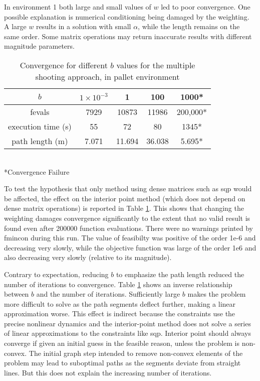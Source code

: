 In environment 1 both large and small values of $w$ led to poor convergence. One possible explanation is numerical conditioning being damaged by the weighting. A large $w$ results in a solution with small $\alpha$, while the length remains on the same order. Some matrix operations may return inaccurate results with different magnitude parameters.
\begin{table}
\begin{center}
	\begin{tabular}{ |c|c|c|c|c| }
		\hline
		 $b$ & $1\times10^{-3}$&  1 & 100 & 1000* \\ 
		 \hline
		 fevals &7929 & 10873 & 11986& 200,000* \\  
		 execution time (s)& 55 & 72 & 80 & 1345* \\
		 path length (m) & 7.071 & 11.694 & 36.038 & 5.695*\\
		 \hline  
	\end{tabular} \\
		 *Convergence Failure
\end{center}
\label{tab:b_dependence}
\caption{Convergence for different $b$ values for the multiple shooting approach, in pallet environment} 
\end{table}
To test the hypothesis that only method using dense matrices such as sqp would be affected, the effect on the interior point method (which does not depend on dense matrix operations) is reported in Table \ref{tab:b_dependence}. This shows that changing the weighting damages convergence significantly to the extent that no valid result is found even after 200000 function evaluations. There were no warnings printed by fmincon during this run. The value of feasibilty was positive of the order 1e-6 and decreasing very slowly, while the objective function was large of the order 1e6 and also decreasing very slowly (relative to its magnitude).

Contrary to expectation, reducing $b$ to emphasize the path length reduced the number of iterations to convergence. Table  \ref{tab:b_dependence} shows an inverse relationship between $b$ and the number of iterations. Sufficiently large $b$ makes the problem more difficult to solve as the path segments deflect further, making a linear approximation worse. This effect is indirect because the constraints use the precise nonlinear dynamics and the interior-point method does not solve a series of linear approximations to the constraints like sqp. Interior point should always converge if given an initial guess in the feasible reason, unless the problem is non-convex. The initial graph step intended to remove non-convex elements of the problem may lead to suboptimal paths as the segments deviate from straight lines. But this does not explain the increasing number of iterations. 

